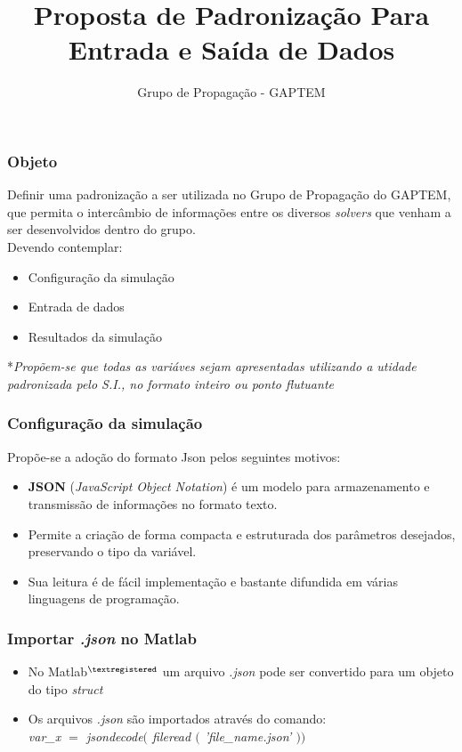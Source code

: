 \documentclass[11pt]{beamer}
\author{Grupo de Propagação - GAPTEM}
\title{Proposta de Padronização Para Entrada e Saída de Dados}
\begin{document}
\begin{frame}
\titlepage
\end{frame}

\begin{frame}
	\frametitle {Objeto}
Definir uma padronização a ser utilizada no Grupo de Propagação do GAPTEM, que permita o intercâmbio de informações entre os diversos \textit{solvers} que venham a ser desenvolvidos dentro do grupo.\\
Devendo contemplar:
	\begin{itemize}
		\item Configuração da simulação
		\item Entrada de dados
		\item Resultados da simulação
	\end{itemize}
*\emph{Propõem-se que todas as variáves sejam apresentadas utilizando a utidade padronizada pelo S.I., no formato inteiro ou ponto flutuante}
\end{frame}

\begin{frame}
\frametitle{Configuração da simulação}
Propõe-se a adoção do formato Json pelos seguintes motivos:
	\begin{itemize}
		\item \textbf{JSON} (\textit{JavaScript Object Notation}) é um modelo para armazenamento e transmissão de informações no formato texto.
		\item Permite a criação de forma compacta e estruturada dos parâmetros desejados, preservando o tipo da variável.
		\item Sua leitura é de fácil implementação e bastante difundida em várias linguagens de programação.	
	\end{itemize} 
\end{frame}

\begin{frame}
\frametitle{Importar \textit{.json} no  Matlab \textregistered}
	\begin{itemize}
		\item No Matlab$^{\textregistered}$ um arquivo \textit{.json} pode ser convertido para um objeto do tipo 						\textit{struct}
		\item Os arquivos \textit{.json} são importados através do comando:\\ \textit{var\_x $=$ jsondecode$($ fileread $($ 'file\_name.json' $) )$}
	\end{itemize}
\end{frame}
\end{document}
